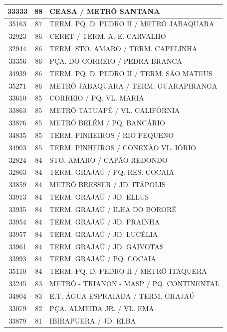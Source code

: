 \documentclass[
	12pt,				%
	oneside,			%
	a4paper,			%
	english,			%
	brazil				%
	]{abntex2ppgsi}
\begin{document}
\begin{apendicesenv}
\begin{longtable}{c|c|p{7cm}}
\hline
    33333 & 88    & CEASA / METRÔ SANTANA \\
\hline
    35163 & 87    & TERM. PQ. D. PEDRO II / METRÔ JABAQUARA \\
\hline
    32923 & 86    & CERET / TERM. A. E. CARVALHO \\
\hline
    32944 & 86    & TERM. STO. AMARO / TERM. CAPELINHA \\
\hline
    33356 & 86    & PÇA. DO CORREIO / PEDRA BRANCA \\
\hline
    34939 & 86    & TERM. PQ. D. PEDRO II / TERM. SÃO MATEUS \\
\hline
    35271 & 86    & METRÔ JABAQUARA / TERM. GUARAPIRANGA \\
\hline
    33610 & 85    & CORREIO / PQ. VL. MARIA \\
\hline
    33863 & 85    & METRÔ TATUAPÉ / VL. CALIFÓRNIA \\
\hline
    33876 & 85    & METRÔ BELÉM / PQ. BANCÁRIO \\
\hline
    34835 & 85    & TERM. PINHEIROS / RIO PEQUENO \\
\hline
    34903 & 85    & TERM. PINHEIROS / CONEXÃO VL. IÓRIO \\
\hline
    32824 & 84    & STO. AMARO / CAPÃO REDONDO \\
\hline
    32863 & 84    & TERM. GRAJAÚ / PQ. RES. COCAIA \\
\hline
    33859 & 84    & METRÔ BRESSER / JD. ITÁPOLIS \\
\hline
    33913 & 84    & TERM. GRAJAÚ / JD. ELLUS \\
\hline
    33935 & 84    & TERM. GRAJAÚ / ILHA DO BORORÉ \\
\hline
    33954 & 84    & TERM. GRAJAÚ / JD. PRAINHA \\
\hline
    33957 & 84    & TERM. GRAJAÚ / JD. LUCÉLIA \\
\hline
    33961 & 84    & TERM. GRAJAÚ / JD. GAIVOTAS \\
\hline
    33993 & 84    & TERM. GRAJAÚ / PQ. COCAIA \\
\hline
    35110 & 84    & TERM. PQ. D. PEDRO II / METRÔ ITAQUERA \\
\hline
    33245 & 83    & METRÔ - TRIANON - MASP / PQ. CONTINENTAL \\
\hline
    34804 & 83    & E.T. ÁGUA ESPRAIADA / TERM. GRAJAÚ \\
\hline
    33079 & 82    & PÇA. ALMEIDA JR. / VL. EMA \\
\hline
    33879 & 81    & IBIRAPUERA / JD. ELBA \\

\end{longtable}
\end{apendicesenv}
\end{document}
